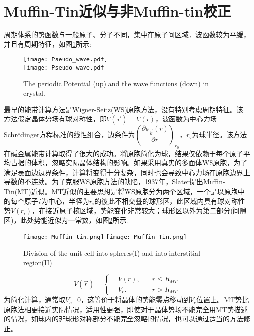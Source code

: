 \section{Muffin-Tin近似与非Muffin-tin校正}
周期体系的势函数与一般原子、分子不同，集中在原子间区域，波函数较为平缓，并且有周期特征，如图\ref{Potential-Wave}所示:
\begin{figure}[h!]
\centering
\texttt{[image: Pseudo\_wave.pdf]}\\
\texttt{[image: Pseudo\_wave.pdf]}
\caption{\small \textrm{The periodic Potential (up) and the wave functions (down) in crystal.}}%
\label{Potential-Wave}
\end{figure}
最早的能带计算方法是Wigner-Seitz(WS)原胞方法\cite{PR43-804_1933}，没有特别考虑周期特征。该方法假定晶体势场有球对称性，即$V(\vec r)=V(r)$，波函数为中心力场Schr\"odinger方程标准的线性组合，边条件为$\left(\dfrac{\partial\psi_{\vec k}(r)}{\partial r}\right)_{r_0}$，$r_0$为球半径。该方法在碱金属能带计算取得了很大的成功。将原胞简化为球，结果仅依赖于每个原子平均占据的体积，忽略实际晶体结构的影响。如果采用真实的多面体WS原胞，为了满足表面边边界条件，计算将变得十分复杂，同时也会导致中心力场在原胞边界上导数的不连续。为了克服WS原胞方法的缺陷，1937年，Slater提出Muffin-Tin(MT)近似\cite{PR51-846_1937}。MT近似的主要思想是将WS原胞分为两个区域，一个是以原胞中的每个原子{\it i}\,为中心，半径为$r_i$的彼此不相交叠的球形区，此区域内具有球对称性势$V(r_i)$，在接近原子核区域，势能变化非常较大；球形区以外为第二部分(间隙区)，此处势能近似为一常数，如图\ref{Muffin_tin-1}所示:
\begin{figure}[h!]
\centering
\texttt{[image: Muffin-tin.png]}
\texttt{[image: Muffin-Tin.png]}
\caption{\small \textrm{Division of the unit cell into spheres(I) and into interstitial region(II)}}%
\label{Muffin_tin-1}
\end{figure}

\begin{equation}
  V(\vec r)=\left\{
  \begin{aligned}
    &V(r),\quad&r\leqslant R_{MT} \\
    &V_c.&r>R_{MT}
  \end{aligned}\right.
  \label{eq:Muffin-Tin}
\end{equation}
为简化计算，通常取$V_c$=0，这等价于将晶体的势能零点移动到$V_c$位置上。MT势比原胞法相更接近实际情况，适用性更强，即使对于晶体势场不能完全用MT势描述的情况，如球内的非球形对称部分不能完全忽略的情况，也可以通过适当的方法修正。

